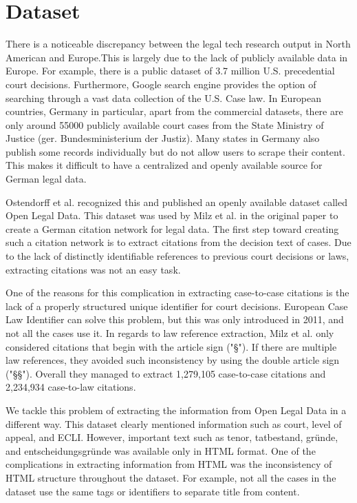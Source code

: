 \documentclass[runningheads]{llncs}
\begin{document}
\section{Dataset}
\label{sec:dataset}

There is a noticeable discrepancy between the legal tech research output in North American and Europe.This is largely due to the lack of publicly available data in Europe. For example, there is a public dataset of 3.7 million U.S. precedential court decisions. Furthermore, Google search engine provides the option of searching through a vast data collection of the U.S. Case law. In European countries, Germany in particular, apart from the commercial datasets, there are only around 55000 publicly available court cases from the State Ministry of Justice (ger. Bundesministerium der Justiz). Many states in Germany also publish some records individually but do not allow users to scrape their content. This makes it difficult to have a centralized and openly available source for German legal data.

Ostendorff et al.\cite{ostendorff2020towards} recognized this and published an openly available dataset called Open Legal Data. This dataset was used by Milz et al. in the original paper\cite{milz2021analysis} to create a German citation network for legal data. The first step toward creating such a citation network is to extract citations from the decision text of cases. Due to the lack of distinctly identifiable references to previous court decisions or laws, extracting citations was not an easy task.

One of the reasons for this complication in extracting case-to-case citations is the lack of a properly structured unique identifier for court decisions. European Case Law Identifier can solve this problem, but this was only introduced in 2011, and not all the cases use it. In regards to law reference extraction, Milz et al. only considered citations that begin with the article sign ("§"). If there are multiple law references, they avoided such inconsistency by using the double article sign ("§§"). Overall they managed to extract 1,279,105 case-to-case citations and 2,234,934 case-to-law citations.

We tackle this problem of extracting the information from Open Legal Data in a different way. This dataset clearly mentioned information such as court, level of appeal, and ECLI. However, important text such as tenor, tatbestand, gründe, and entscheidungsgründe was available only in HTML format. One of the complications in extracting information from HTML was the inconsistency of HTML structure throughout the dataset. For example, not all the cases in the dataset use the same tags or identifiers to separate title from content.
\end{document}
